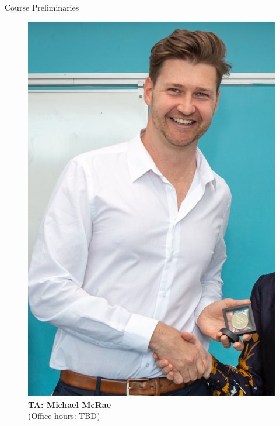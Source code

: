 \documentclass[11pt,english,handout]{beamer}
\begin{document}
\begin{frame}{Course Preliminaries}
\begin{figure}
\begin{minipage}{0.45\textwidth}
			\includegraphics[width=\textwidth, trim=0 250 0 0, clip]{headshot_mcrae.png} %
			\caption*{\textbf{TA: Michael McRae} \\ (Office hours: TBD)}
		\end{minipage}
	\end{figure}

\end{frame}
\end{document}
